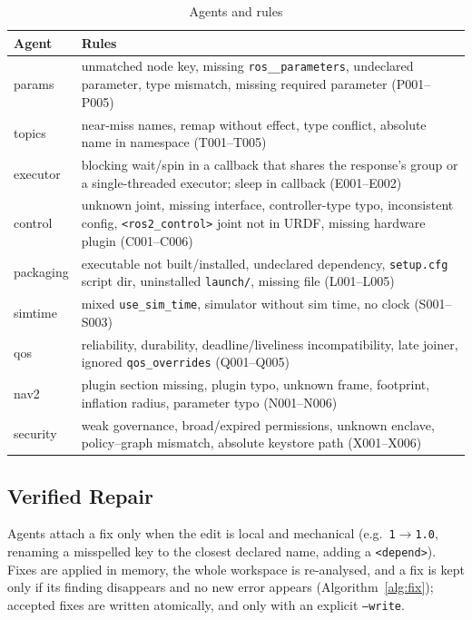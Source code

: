\documentclass[conference]{IEEEtran}
\newcommand{\code}[1]{\texttt{#1}}
\begin{document}
\begin{table}[t]
\centering
\caption{Agents and rules}
\label{tab:rules}
\footnotesize
\begin{tabular}{@{}p{1.1cm}p{6.7cm}@{}}
\toprule
Agent & Rules \\
\midrule
params    & unmatched node key, missing \code{ros\_\_parameters}, undeclared parameter, type mismatch, missing required parameter (P001--P005)\\
topics    & near-miss names, remap without effect, type conflict, absolute name in namespace (T001--T005)\\
executor  & blocking wait/spin in a callback that shares the response's group or a single-threaded executor; sleep in callback (E001--E002)\\
control   & unknown joint, missing interface, controller-type typo, inconsistent config, \code{<ros2\_control>} joint not in URDF, missing hardware plugin (C001--C006)\\
packaging & executable not built/installed, undeclared dependency, \code{setup.cfg} script dir, uninstalled \code{launch/}, missing file (L001--L005)\\
simtime   & mixed \code{use\_sim\_time}, simulator without sim time, no clock (S001--S003)\\
qos       & reliability, durability, deadline/liveliness incompatibility, late joiner, ignored \code{qos\_overrides} (Q001--Q005)\\
nav2      & plugin section missing, plugin typo, unknown frame, footprint, inflation radius, parameter typo (N001--N006)\\
security  & weak governance, broad/expired permissions, unknown enclave, policy--graph mismatch, absolute keystore path (X001--X006)\\
\bottomrule
\end{tabular}
\end{table}

\subsection{Verified Repair}
\label{sec:repair}

Agents attach a fix only when the edit is local and mechanical (e.g.\ \code{1}$\to$\code{1.0},
renaming a misspelled key to the closest declared name, adding a \code{<depend>}). Fixes are
applied in memory, the whole workspace is re-analysed, and a fix is kept only if its finding
disappears and no new error appears (Algorithm~\ref{alg:fix}); accepted fixes are written
atomically, and only with an explicit \code{--write}.
\end{document}
